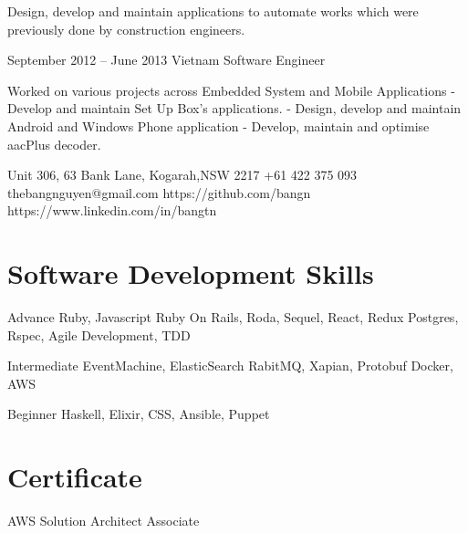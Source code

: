 \documentclass{tccv}
\begin{document}
\begin{eventlist}
    Design, develop and maintain applications to automate works which were previously done by construction engineers.

\item{September 2012 -- June 2013}
    {Vietnam}
    {Software Engineer}

    Worked on various projects across Embedded System and Mobile Applications
    \newline - Develop and maintain Set Up Box's applications.
    \newline - Design, develop and maintain Android and Windows Phone application
    \newline - Develop, maintain and optimise aacPlus decoder.

\end{eventlist}

\personal
    {Unit 306, 63 Bank Lane, Kogarah,\newline NSW 2217}
    {+61 422 375 093}
    {thebangnguyen@gmail.com}
    {https://github.com/bangn}
    {https://www.linkedin.com/in/bangtn}

\section{Software Development Skills}

\begin{factlist}

\item{Advance}
    {Ruby, Javascript
    \newline Ruby On Rails, Roda, Sequel, React, Redux
    \newline Postgres, Rspec,
    \newline Agile Development, TDD}

\item{Intermediate}
    {EventMachine, ElasticSearch
    \newline RabitMQ, Xapian, Protobuf
    \newline Docker, AWS}

\item{Beginner}
    {Haskell, Elixir, CSS, Ansible, Puppet}
\end{factlist}

\section{Certificate}

\begin{factlist}

\item{AWS Solution Architect}
    {Associate}

\end{factlist}
\end{document}
